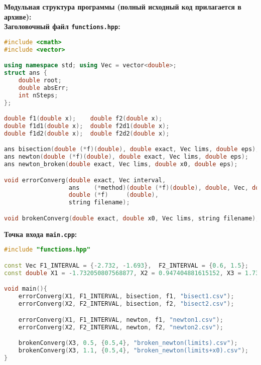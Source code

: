 {\large\bf{Модульная структура программы (полный исходный код прилагается в архиве):}}\\
{\bf Заголовочный файл \texttt{functions.hpp}:}
\begin{lstlisting}[language=c++]
#include <cmath>
#include <vector>

using namespace std; using Vec = vector<double>;
struct ans {
    double root;
    double absErr;
    int nSteps;
};

double f1(double x);    double f2(double x);
double f1d1(double x);  double f2d1(double x);
double f1d2(double x);  double f2d2(double x);

ans bisection(double (*f)(double), double exact, Vec lims, double eps);
ans newton(double (*f)(double), double exact, Vec lims, double eps);
ans newton_broken(double exact, Vec lims, double x0, double eps);

void errorConverg(double exact, Vec interval,
                  ans    (*method)(double (*f)(double), double, Vec, double),
                  double (*f)     (double),
                  string filename);

void brokenConverg(double exact, double x0, Vec lims, string filename);
\end{lstlisting}
{\bf Точка входа \texttt{main.cpp}:}
\begin{lstlisting}[language=c++]
#include "functions.hpp"

const Vec F1_INTERVAL = {-2.732, -1.693},  F2_INTERVAL = {0.6, 1.5};
const double X1 = -1.732050807568877, X2 = 0.947404881615152, X3 = 1.732050807568877;

void main(){
    errorConverg(X1, F1_INTERVAL, bisection, f1, "bisect1.csv");
    errorConverg(X2, F2_INTERVAL, bisection, f2, "bisect2.csv");

    errorConverg(X1, F1_INTERVAL, newton, f1, "newton1.csv");
    errorConverg(X2, F2_INTERVAL, newton, f2, "newton2.csv");

    brokenConverg(X3, 0.5, {0.5,4}, "broken_newton(limits).csv");
    brokenConverg(X3, 1.1, {0.5,4}, "broken_newton(limits+x0).csv");
}
\end{lstlisting}
